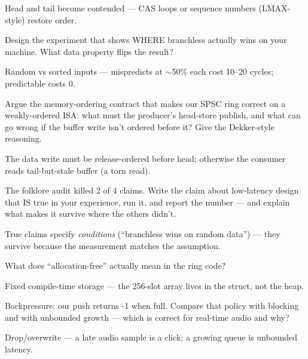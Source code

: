 \begin{solution}[hint]
Head and tail become contended --- CAS loops or sequence numbers
(LMAX-style) restore order.
\end{solution}
\begin{exercise}[medium]
Design the experiment that shows WHERE branchless actually wins
on your machine. What data property flips the result?
\end{exercise}
\begin{solution}[hint]
Random vs sorted inputs --- mispredicts at $\sim$50\% each cost
10--20 cycles; predictable costs 0.
\end{solution}
\begin{exercise}[hard]
Argue the memory-ordering contract that makes our SPSC ring
correct on a weakly-ordered ISA: what must the producer's
head-store publish, and what can go wrong if the buffer write
isn't ordered before it? Give the Dekker-style reasoning.
\end{exercise}
\begin{solution}[hint]
The data write must be release-ordered before head; otherwise
the consumer reads tail-but-stale buffer (a torn read).
\end{solution}
\begin{exercise}[hard]
The folklore audit killed 2 of 4 claims. Write the claim about
low-latency design that IS true in your experience, run it, and
report the number --- and explain what makes it survive where
the others didn't.
\end{exercise}
\begin{solution}[hint]
True claims specify \emph{conditions} (``branchless wins on
random data'') --- they survive because the measurement matches
the assumption.
\end{solution}
\begin{exercise}[easy]
What does ``allocation-free'' actually mean in the ring code?
\end{exercise}
\begin{solution}[hint]
Fixed compile-time storage --- the 256-slot array lives in the
struct, not the heap.
\end{solution}
\begin{exercise}[medium]
Backpressure: our push returns -1 when full. Compare that policy
with blocking and with unbounded growth --- which is correct for
real-time audio and why?
\end{exercise}
\begin{solution}[hint]
Drop/overwrite --- a late audio sample is a click; a growing
queue is unbounded latency.
\end{solution}
